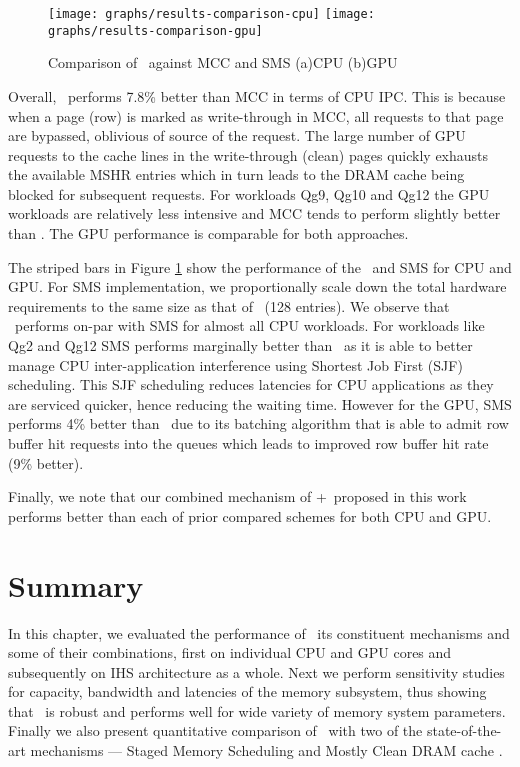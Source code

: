 \begin{figure}[!htb]
	\centering
	\texttt{[image: graphs/results-comparison-cpu]}
	\texttt{[image: graphs/results-comparison-gpu]}
	\caption{Comparison of \cachename\ against MCC \cite{mostly-clean} and SMS \cite{sms} (a)CPU (b)GPU}
	\label{results-comparison}
\end{figure}
 
\par Overall, \bypassname\ performs 7.8\% better than MCC in terms of CPU IPC. This is because when a page (row) is marked as write-through in MCC, all requests to that page are bypassed, oblivious of source of the request. The large number of GPU requests to the cache lines in the write-through (clean) pages quickly exhausts the available MSHR entries which in turn leads to the DRAM cache being blocked for subsequent requests. For workloads Qg9, Qg10 and Qg12 the GPU workloads are relatively less intensive and MCC tends to perform slightly better than \bypassname. The GPU performance is comparable for both approaches.
\par The striped bars in Figure \ref{results-comparison} show the performance of the \prioname\ and SMS for CPU and GPU. For SMS implementation, we proportionally scale down the total hardware requirements to the same size as that of \prioname\ (128 entries). We observe that \prioname\ performs on-par with SMS for almost all CPU workloads. For workloads like Qg2 and Qg12 SMS performs marginally better than \prioname\ as it is able to better manage CPU inter-application interference using Shortest Job First (SJF) scheduling. This SJF scheduling reduces latencies for CPU applications as they are serviced quicker, hence reducing the waiting time. However for the GPU, SMS performs 4\% better than \prioname\ due to its batching algorithm that is able to admit row buffer hit requests into the queues which leads to improved row buffer hit rate (9\% better). 
\par Finally, we note that our combined mechanism of \prioname+\bypassname\ proposed in this work performs better than each of prior compared schemes for both CPU and GPU.

\section{Summary}
In this chapter, we evaluated the performance of \cachename\, its constituent mechanisms and some of their combinations, first on individual CPU and GPU cores and subsequently on IHS architecture as a whole. Next we perform sensitivity studies for capacity, bandwidth and latencies of the memory subsystem, thus showing that \cachename\ is robust and performs well for wide variety of memory system parameters. Finally we also present quantitative comparison of \cachename\ with two of the state-of-the-art mechanisms --- Staged Memory Scheduling \cite{sms} and Mostly Clean DRAM cache \cite{mostly-clean}.